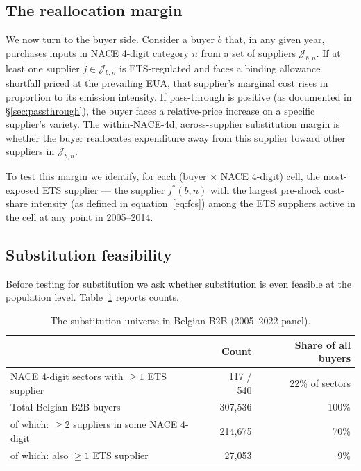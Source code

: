 \subsection{The reallocation margin}

We now turn to the buyer side. Consider a buyer $b$ that, in any given year, purchases inputs in NACE 4-digit category $n$ from a set of suppliers $\mathcal{J}_{b,n}$. If at least one supplier $j \in \mathcal{J}_{b,n}$ is ETS-regulated and faces a binding allowance shortfall priced at the prevailing EUA, that supplier's marginal cost rises in proportion to its emission intensity. If pass-through is positive (as documented in \S\ref{sec:passthrough}), the buyer faces a relative-price increase on a specific supplier's variety. The within-NACE-4d, across-supplier substitution margin is whether the buyer reallocates expenditure away from this supplier toward other suppliers in $\mathcal{J}_{b,n}$.

To test this margin we identify, for each (buyer $\times$ NACE 4-digit) cell, the most-exposed ETS supplier --- the supplier $j^*(b,n)$ with the largest pre-shock cost-share intensity (as defined in equation~\ref{eq:fcs}) among the ETS suppliers active in the cell at any point in 2005--2014.

\subsection{Substitution feasibility}

Before testing for substitution we ask whether substitution is even feasible at the population level. Table~\ref{tab:substitution_universe} reports counts.

\begin{table}[H]
    \centering
    \caption{The substitution universe in Belgian B2B (2005--2022 panel).}
    \label{tab:substitution_universe}
    \begin{tabular}{lrr}
        \toprule
        & Count & Share of all buyers \\
        \midrule
        NACE 4-digit sectors with $\geq 1$ ETS supplier      &   117 / 540 & 22\% of sectors \\
        Total Belgian B2B buyers                              & 307{,}536 & 100\% \\
        \quad of which: $\geq 2$ suppliers in some NACE 4-digit & 214{,}675 & 70\% \\
        \quad \quad of which: also $\geq 1$ ETS supplier        &  27{,}053 & 9\% \\
        \bottomrule
    \end{tabular}
\end{table}

